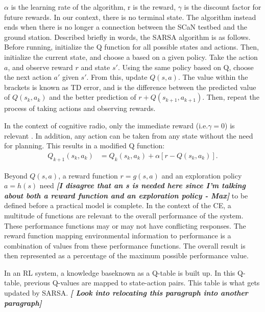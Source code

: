 		\par $\alpha$ is the learning rate of the algorithm, r is the reward, $\gamma$ is the discount factor for future rewards. In our context, there is no terminal state. The algorithm instead ends when there is no longer a connection between the SCaN testbed and the ground station. Described briefly in words, the SARSA algorithm is as follows. Before running, initialize the Q function for all possible states and actions. Then, initialize the current state, and choose a based on a given policy. Take the action $a$, and observe reward $r$ and state $s'$. Using the same policy based on Q, choose the next action $a'$ given $s'$. From this, update $Q(s,a)$. The value within the brackets is known as TD error, and is the difference between the predicted value of $Q(s_k,a_k)$ and the better prediction of $r + Q(s_{k+1},a_{k+1})$. Then, repeat the process of taking actions and observing rewards. 
	\par In the context of cognitive radio, only the immediate reward (i.e.$\gamma = 0$) is relevant \cite{AIAA_Paper}. In addition, any action can be taken from any state without the need for planning. This results in a modified Q function:
	\begin{align}
		Q_{k+1}(s_k,a_k) &= Q_k(s_k,a_k) + \alpha[r - Q(s_k,a_k)]. \label{eq:bg_sarsa2}
	\end{align}
	\par Beyond $Q(s,a)$, a reward function $r = g(s,a)$ and an exploration policy $a = h(s)$ need \textbf{\textit{[I disagree that an s is needed here since I'm talking about both a reward function and an exploration policy - Max]}} to be defined before a practical model is complete. In the context of the CE, a multitude of functions are relevant to the overall performance of the system. These performance functions may or may not have conflicting responses. The reward function mapping environmental information to performance is a combination of values from these performance functions. The overall result is then represented as a percentage of the maximum possible performance value.   
	\par In an RL system, a knowledge baseknown as a Q-table is built up. In this Q-table, previous Q-values are mapped to state-action pairs. This table is what gets updated by SARSA. \textbf{\textit{[ Look into relocating this paragraph into another paragraph]}} 
	
